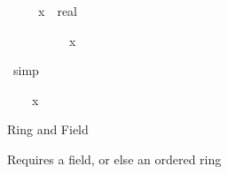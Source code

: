 \begin{isabellebody}
\begin{isamarkuptxt}
\begin{isabelle}
\end{isabelle}%
\end{isamarkuptxt}%
\isamarkuptrue%
\isamarkupfalse%
%
\endisatagproof
{\isafoldproof}%
%
\isadelimproof
%
\endisadelimproof
\isanewline
\isanewline
{}\isamarkupfalse%
\ {}{}{}{}{}{}\ {}\ {}{}{}{}{}{}\ {}\ {}x\ {}{}\ real{}{}%
\isadelimproof
%
\endisadelimproof
%
\isatagproof
%
\begin{isamarkuptxt}%
\begin{isabelle}%
\ {}{}\ {}\ {}\ {}\ {}\ {}{}\ {}\ {}{}{}\ {}\ x%
\end{isabelle}%
\end{isamarkuptxt}%
\isamarkuptrue%
\isamarkupfalse%
\ simp%
\begin{isamarkuptxt}%
\begin{isabelle}%
\ {}{}\ {}\ {}\ x\ {}\ {}%
\end{isabelle}%
\end{isamarkuptxt}%
\isamarkuptrue%
\isamarkupfalse%
%
\endisatagproof
{\isafoldproof}%
%
\isadelimproof
%
\endisadelimproof
%
\begin{isamarkuptext}%
Ring and Field

Requires a field, or else an ordered ring


\end{isamarkuptext}
\end{isabellebody}
